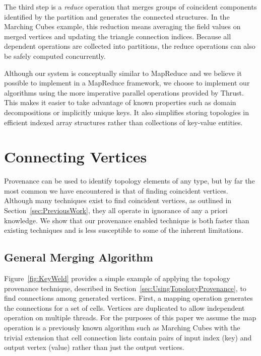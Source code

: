 \documentclass[10pt,journal,cspaper,compsoc]{IEEEtran}
\begin{document}
The third step is a \emph{reduce} operation that merges groups of
coincident components identified by the partition and generates the
connected structures.  In the Marching Cubes example, this reduction means
averaging the field values on merged vertices and updating the triangle
connection indices.  Because all dependent operations are collected into
partitions, the reduce operations can also be safely computed
concurrently.

Although our system is conceptually similar to MapReduce and we believe it
possible to implement in a MapReduce framework, we choose to implement our
algorithms using the more imperative parallel operations provided by
Thrust.  This makes it easier to take advantage of known properties such as
domain decompositions or implicitly unique keys.  It also simplifies
storing topologies in efficient indexed array structures rather than
collections of key-value entities.

\section{Connecting Vertices}
\label{sec:ConnectingVertices}

Provenance can be used to identify topology elements of any type, but by
far the most common we have encountered is that of finding coincident
vertices.  Although many techniques exist to find coincident vertices, as
outlined in Section~\ref{sec:PreviousWork}, they all operate in ignorance
of any a priori knowledge.  We show that our provenance enabled technique
is both faster than existing techniques and is less susceptible to some of
the inherent limitations.

\subsection{General Merging Algorithm}
\label{sec:GeneralMergingAlgorithm}

Figure~\ref{fig:KeyWeld} provides a simple example of applying the topology
provenance technique, described in
Section~\ref{sec:UsingTopologyProvenance}, to find connections among
generated vertices.  First, a mapping operation generates the connections
for a set of cells.  Vertices are duplicated to allow independent operation
on multiple threads.  For the purposes of this paper we assume the map
operation is a previously known algorithm such as Marching Cubes with the
trivial extension that cell connection lists contain pairs of input index
(key) and output vertex (value) rather than just the output vertices.
\end{document}

